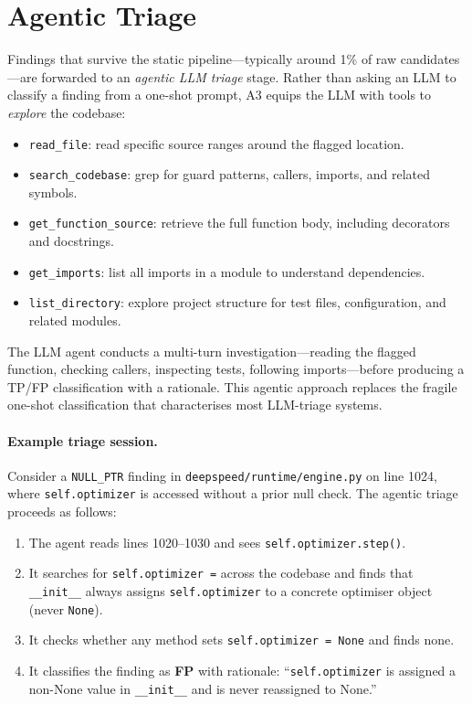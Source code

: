 \documentclass[sigconf,review,anonymous]{acmart}
\begin{document}
\section{Agentic Triage}\label{sec:triage}

Findings that survive the static pipeline---typically around 1\% of raw candidates---are forwarded to an \emph{agentic LLM triage} stage.
Rather than asking an LLM to classify a finding from a one-shot prompt, \textsc{A3} equips the LLM with tools to \emph{explore} the codebase:

\begin{itemize}
  \item \texttt{read\_file}: read specific source ranges around the flagged location.
  \item \texttt{search\_codebase}: grep for guard patterns, callers, imports, and related symbols.
  \item \texttt{get\_function\_source}: retrieve the full function body, including decorators and docstrings.
  \item \texttt{get\_imports}: list all imports in a module to understand dependencies.
  \item \texttt{list\_directory}: explore project structure for test files, configuration, and related modules.
\end{itemize}

The LLM agent conducts a multi-turn investigation---reading the flagged function, checking callers, inspecting tests, following imports---before producing a TP/FP classification with a rationale.
This agentic approach replaces the fragile one-shot classification that characterises most LLM-triage systems.

\paragraph{Example triage session.}
Consider a \texttt{NULL\_PTR} finding in \texttt{deepspeed/runtime/engine.py} on line 1024, where \texttt{self.optimizer} is accessed without a prior null check.
The agentic triage proceeds as follows:
\begin{enumerate}
  \item The agent reads lines 1020--1030 and sees \texttt{self.optimizer.step()}.
  \item It searches for \texttt{self.optimizer =} across the codebase and finds that \texttt{__init__} always assigns \texttt{self.optimizer} to a concrete optimiser object (never \texttt{None}).
  \item It checks whether any method sets \texttt{self.optimizer = None} and finds none.
  \item It classifies the finding as \textbf{FP} with rationale: ``\texttt{self.optimizer} is assigned a non-None value in \texttt{__init__} and is never reassigned to None.''
\end{enumerate}
\end{document}
